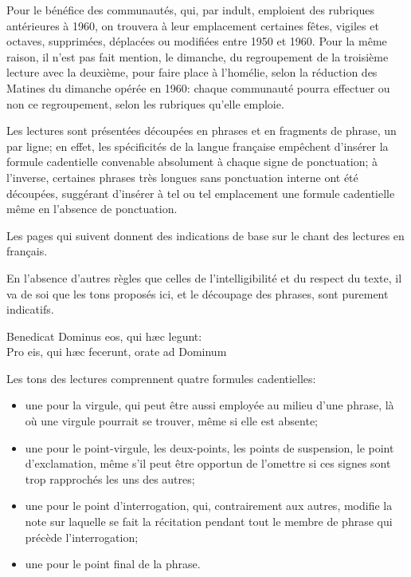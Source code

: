 \documentclass[twoside, french]{book}
\begin{document}
Pour le bénéfice des communautés, qui, par indult, emploient des rubriques antérieures à 1960,
on trouvera à leur emplacement certaines fêtes, vigiles et octaves, supprimées, déplacées ou modifiées entre 1950 et 1960.
Pour la même raison, il n'est pas fait mention, le dimanche, du regroupement de la troisième lecture avec la deuxième, pour faire place à l'homélie,
selon la réduction des Matines du dimanche opérée en 1960:
chaque communauté pourra effectuer ou non ce regroupement, selon les rubriques qu'elle emploie.

Les lectures sont présentées découpées en phrases et en fragments de phrase, un par ligne;
en effet, les spécificités de la langue française empêchent d'insérer la formule cadentielle convenable absolument à chaque signe de ponctuation;
à l'inverse, certaines phrases très longues sans ponctuation interne ont été découpées, suggérant d'insérer à tel ou tel emplacement une formule cadentielle
même en l'absence de ponctuation.

Les pages qui suivent donnent des indications de base sur le chant des lectures en français.

En l'absence d'autres règles que celles de l'intelligibilité et du respect du texte, il va de soi que les tons proposés ici, et le découpage des phrases, sont purement indicatifs.

\vfill

\begin{center}{\sc Benedicat Dominus eos, qui hæc legunt:\\
Pro eis, qui hæc fecerunt, orate ad Dominum}
\end{center}

\newpage

\vspace{2cm}

Les tons des lectures comprennent quatre formules cadentielles:
\begin{itemize}
\item une pour la virgule, qui peut être aussi employée au milieu d'une phrase, là où une virgule pourrait se trouver, même si elle est absente;
\item une pour le point-virgule, les deux-points, les points de suspension, le point d'exclamation, même s'il peut être opportun de l'omettre si ces signes sont trop rapprochés les uns des autres;
\item une pour le point d'interrogation, qui, contrairement aux autres, modifie la note sur laquelle se fait la récitation pendant tout le membre de phrase qui précède l'interrogation;
\item une pour le point final de la phrase.
\end{itemize}
\end{document}
